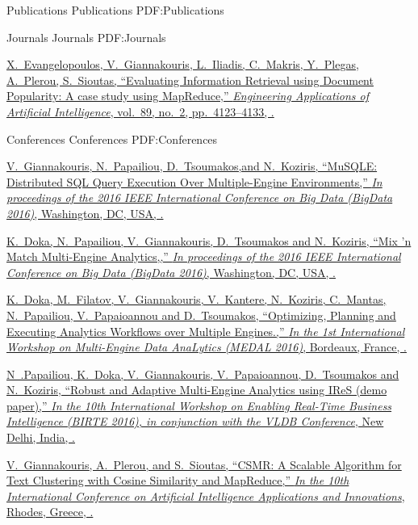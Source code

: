 
\Section
{Publications}
{Publications}
{PDF:Publications}

\SubSection
{Journals}
{Journals}
{PDF:Journals}

\begingroup
\renewcommand{\MaxNumberedItem}{[88]}

\BigGap
\NumberedItem{[1]}
\href{http://www.example.com/my-paper-doi-5}
{X.~Evangelopoulos, \underline{V.~Giannakouris}, L.~Iliadis, C.~Makris, Y.~Plegas, A.~Plerou, S.~Sioutas,
``Evaluating Information Retrieval using Document Popularity: A case
study using MapReduce,''
\textit{Engineering Applications of Artificial Intelligence},
vol.~89,
no.~2,
pp.~4123--4133,
.}

\endgroup

\BigGap
\SubSection
{Conferences}
{Conferences}
{PDF:Conferences}

\begingroup
\renewcommand{\MaxNumberedItem}{[8888]}

\BigGap
\Gap
\NumberedItem{[1]}
\href{http://www.example.com/my-paper-doi-3}
{\underline{V.~Giannakouris}, N.~Papailiou, D.~Tsoumakos,and N.~Koziris,
	``MuSQLE: Distributed SQL Query Execution Over Multiple-Engine Environments,'' \textit{In proceedings of the 2016 IEEE International Conference on Big Data (BigData 2016)},
	Washington, DC, USA,
	.}

\NumberedItem{[2]}
\href{http://www.example.com/my-paper-doi-3}
{K.~Doka, N.~Papailiou, \underline{V.~Giannakouris}, D.~Tsoumakos and N.~Koziris,
``Mix 'n Match Multi-Engine Analytics,,'' \textit{In proceedings of the 2016 IEEE International Conference on Big Data (BigData 2016)},
Washington, DC, USA,
.}

\NumberedItem{[3]}
\href{http://www.example.com/my-paper-doi-3}
{K.~Doka, M.~Filatov, \underline{V.~Giannakouris}, V.~Kantere, N.~Koziris,
	C.~Mantas, N.~Papailiou, V.~Papaioannou and D.~Tsoumakos,
	``Optimizing, Planning and Executing Analytics Workflows over Multiple Engines.,'' \textit{In the 1st International Workshop on Multi-Engine Data AnaLytics (MEDAL 2016)},
	Bordeaux, France,
.}

\NumberedItem{[4]}
\href{http://www.example.com/my-paper-doi-3}
{N~.Papailiou, K.~Doka, \underline{V.~Giannakouris}, V.~Papaioannou, D.~Tsoumakos and N.~Koziris,
	``Robust and Adaptive Multi-Engine Analytics using IReS (demo paper),'' \textit{In the 10th International Workshop on Enabling Real-Time Business Intelligence (BIRTE 2016), in conjunction with the VLDB Conference},
	New Delhi, India,
	.}

\NumberedItem{[5]}
\href{http://www.example.com/my-paper-doi-3}
{\underline{V.~Giannakouris}, A.~Plerou, and S.~Sioutas,
	``CSMR: A Scalable Algorithm for Text Clustering with Cosine Similarity and MapReduce,''
	\textit{In the 10th International Conference on Artificial Intelligence Applications and Innovations},
	Rhodes, Greece,
	.}




\endgroup